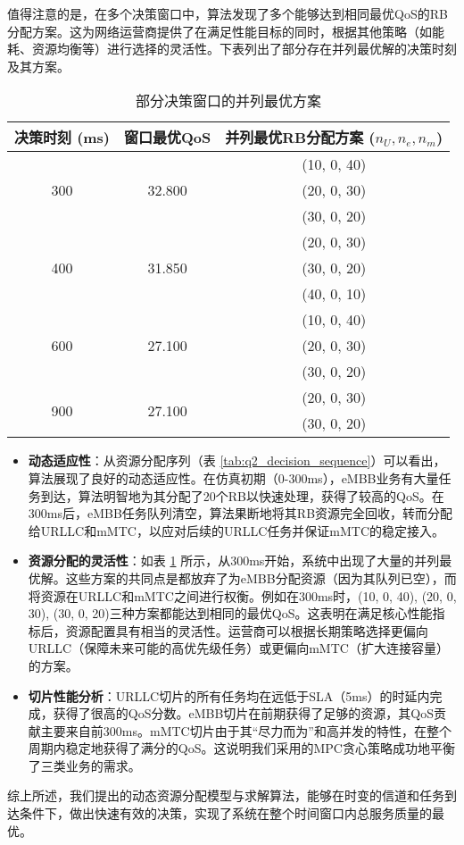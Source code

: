 值得注意的是，在多个决策窗口中，算法发现了多个能够达到相同最优QoS的RB分配方案。这为网络运营商提供了在满足性能目标的同时，根据其他策略（如能耗、资源均衡等）进行选择的灵活性。下表列出了部分存在并列最优解的决策时刻及其方案。

\begin{table}[H]
\centering
\caption{部分决策窗口的并列最优方案}
\label{tab:q2_tie_solutions}
\begin{tabular}{ccc}
\hline
\textbf{决策时刻 (ms)} & \textbf{窗口最优QoS} & \textbf{并列最优RB分配方案 ($n_U, n_e, n_m$)} \\
\hline
\multirow{3}{*}{300} & \multirow{3}{*}{32.800} & (10, 0, 40) \\
 & & (20, 0, 30) \\
 & & (30, 0, 20) \\
\hline
\multirow{3}{*}{400} & \multirow{3}{*}{31.850} & (20, 0, 30) \\
 & & (30, 0, 20) \\
 & & (40, 0, 10) \\
\hline
\multirow{3}{*}{600} & \multirow{3}{*}{27.100} & (10, 0, 40) \\
 & & (20, 0, 30) \\
 & & (30, 0, 20) \\
\hline
\multirow{2}{*}{900} & \multirow{2}{*}{27.100} & (20, 0, 30) \\
 & & (30, 0, 20) \\
\hline
\end{tabular}
\end{table}

\begin{itemize}
    \item \textbf{动态适应性}：从资源分配序列（表 \ref{tab:q2_decision_sequence}）可以看出，算法展现了良好的动态适应性。在仿真初期（0-300ms），eMBB业务有大量任务到达，算法明智地为其分配了20个RB以快速处理，获得了较高的QoS。在300ms后，eMBB任务队列清空，算法果断地将其RB资源完全回收，转而分配给URLLC和mMTC，以应对后续的URLLC任务并保证mMTC的稳定接入。
    \item \textbf{资源分配的灵活性}：如表 \ref{tab:q2_tie_solutions} 所示，从300ms开始，系统中出现了大量的并列最优解。这些方案的共同点是都放弃了为eMBB分配资源（因为其队列已空），而将资源在URLLC和mMTC之间进行权衡。例如在300ms时，(10, 0, 40), (20, 0, 30), (30, 0, 20)三种方案都能达到相同的最优QoS。这表明在满足核心性能指标后，资源配置具有相当的灵活性。运营商可以根据长期策略选择更偏向URLLC（保障未来可能的高优先级任务）或更偏向mMTC（扩大连接容量）的方案。
    \item \textbf{切片性能分析}：URLLC切片的所有任务均在远低于SLA（5ms）的时延内完成，获得了很高的QoS分数。eMBB切片在前期获得了足够的资源，其QoS贡献主要来自前300ms。mMTC切片由于其“尽力而为”和高并发的特性，在整个周期内稳定地获得了满分的QoS。这说明我们采用的MPC贪心策略成功地平衡了三类业务的需求。
\end{itemize}

综上所述，我们提出的动态资源分配模型与求解算法，能够在时变的信道和任务到达条件下，做出快速有效的决策，实现了系统在整个时间窗口内总服务质量的最优。